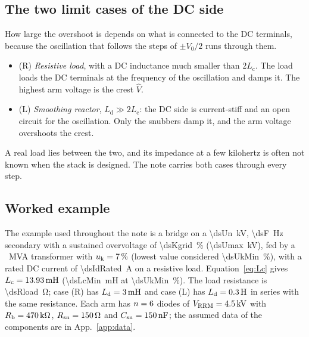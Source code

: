 \documentclass[10pt,a4paper]{scrartcl}
\newcommand{\Vrrm}{V_\mathrm{RRM}}
\newcommand{\Csn}{C_\mathrm{sn}}
\newcommand{\Rsn}{R_\mathrm{sn}}
\newcommand{\Rb}{R_\mathrm{b}}
\newcommand{\Lc}{L_\mathrm{c}}
\newcommand{\Ld}{L_\mathrm{d}}
\newcommand{\Vo}{V_0}
\newcommand{\Vh}{\hat V}
\newcommand{\uk}{u_\mathrm{k}}
\newcommand{\caseR}{(R)}
\newcommand{\caseL}{(L)}
\begin{document}
\subsection{The two limit cases of the DC side}
\label{sec:dcside}
How large the overshoot is depends on what is connected to the DC terminals, because the oscillation that follows the steps of $\pm\Vo/2$ runs through them.
\begin{itemize}
\item \caseR{} \emph{Resistive load}, with a DC inductance much smaller than $2\Lc$. The load loads the DC terminals at the frequency of the oscillation and damps it. The highest arm voltage is the crest $\Vh$.
\item \caseL{} \emph{Smoothing reactor}, $\Ld \gg 2\Lc$: the DC side is current-stiff and an open circuit for the oscillation. Only the snubbers damp it, and the arm voltage overshoots the crest.
\end{itemize}
A real load lies between the two, and its impedance at a few kilohertz is often not known when the stack is designed. The note carries both cases through every step.

\subsection{Worked example}
\label{sec:ex-bridge}
The example used throughout the note is a bridge on a \SI{\dsUn}{\kilo\volt}, \SI{\dsF}{\hertz} secondary with a sustained overvoltage of \SI{\dsKgrid}{\percent} (\SI{\dsUmax}{\kilo\volt}), fed by a \dsSt~MVA transformer with $\uk = \SI{\dsUk}{\percent}$ (lowest value considered \SI{\dsUkMin}{\percent}), with a rated DC current of \SI{\dsIdRated}{\ampere} on a resistive load. Equation~\eqref{eq:Lc} gives $\Lc = \SI{\dsLc}{\milli\henry}$ (\SI{\dsLcMin}{\milli\henry} at \SI{\dsUkMin}{\percent}). The load resistance is \SI{\dsRload}{\ohm}; case \caseR{} has $\Ld = \SI{\dsLdR}{\milli\henry}$ and case \caseL{} has $\Ld = \SI{\dsLdL}{\henry}$ in series with the same resistance. Each arm has $n = 6$ diodes of $\Vrrm = \SI{\dsVrrm}{\kilo\volt}$ with $\Rb = \SI{\dsRb}{\kilo\ohm}$, $\Rsn = \SI{\dsRsn}{\ohm}$ and $\Csn = \SI{\dsCsn}{\nano\farad}$; the assumed data of the components are in App.~\ref{app:data}.
\end{document}
